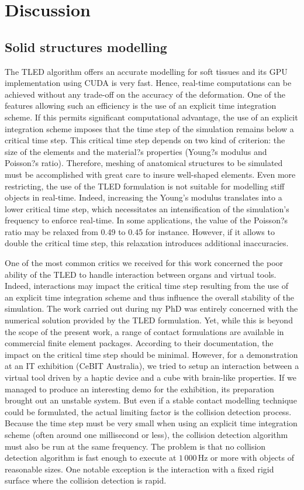 \section{Discussion}

	\subsection{Solid structures modelling}

The TLED algorithm offers an accurate modelling for soft tissues and its GPU implementation using CUDA is very fast. Hence, real-time computations can be achieved without any trade-off on the accuracy of the deformation. One of the features allowing such an efficiency is the use of an explicit time integration scheme. If this permits significant computational advantage, the use of an explicit integration scheme imposes that the time step of the simulation remains below a critical time step. This critical time step depends on two kind of criterion: the size of the elements and the material?s properties (Young?s modulus and Poisson?s ratio). Therefore, meshing of anatomical structures to be simulated must be accomplished with great care to insure well-shaped elements. Even more restricting, the use of the TLED formulation is not suitable for modelling stiff objects in real-time. Indeed, increasing the Young's modulus translates into a lower critical time step, which necessitates an intensification of the simulation's frequency to enforce real-time. In some applications, the value of the Poisson?s ratio may be relaxed from 0.49 to 0.45 for instance. However, if it allows to double the critical time step, this relaxation introduces additional inaccuracies. 

One of the most common critics we received for this work concerned the poor ability of the TLED to handle interaction between organs and virtual tools. Indeed, interactions may impact the critical time step resulting from the use of an explicit time integration scheme and thus influence the overall stability of the simulation. The work carried out during my PhD was entirely concerned with the numerical solution provided by the TLED formulation. Yet, while this is beyond the scope of the present work, a range of contact formulations are available in commercial finite element packages. According to their documentation, the impact on the critical time step should be minimal. However, for a demonstration at an IT exhibition (CeBIT Australia), we tried to setup an interaction between a virtual tool driven by a haptic device and a cube with brain-like properties. If we managed to produce an interesting demo for the exhibition, its preparation brought out an unstable system. But even if a stable contact modelling technique could be formulated, the actual limiting factor is the collision detection process. Because the time step must be very small when using an explicit time integration scheme (often around one millisecond or less), the collision detection algorithm must also be run at the same frequency. The problem is that no collision detection algorithm is fast enough to execute at $ 1\,000\,$Hz or more with objects of reasonable sizes. One notable exception is the interaction with a fixed rigid surface where the collision detection is rapid. 

